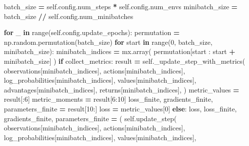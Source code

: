 \documentclass[
  american,
  11pt,
  letterpaper,
]{article}
\newenvironment{Shaded}{\begin{snugshade}}{\end{snugshade}}
\newcommand{\BuiltInTok}[1]{#1}
\newcommand{\ControlFlowTok}[1]{\textcolor[rgb]{0.13,0.29,0.53}{\textbf{#1}}}
\newcommand{\DecValTok}[1]{\textcolor[rgb]{0.00,0.00,0.81}{#1}}
\newcommand{\KeywordTok}[1]{\textcolor[rgb]{0.13,0.29,0.53}{\textbf{#1}}}
\newcommand{\NormalTok}[1]{#1}
\newcommand{\OperatorTok}[1]{\textcolor[rgb]{0.81,0.36,0.00}{\textbf{#1}}}
\newcommand{\VariableTok}[1]{\textcolor[rgb]{0.00,0.00,0.00}{#1}}
\renewenvironment{Shaded}{\par\smallskip}{\par\smallskip}
\begin{document}
\begin{Shaded}
\begin{Highlighting}[]
\NormalTok{        batch\_size }\OperatorTok{=} \VariableTok{self}\NormalTok{.config.num\_steps }\OperatorTok{*} \VariableTok{self}\NormalTok{.config.num\_envs}
\NormalTok{        minibatch\_size }\OperatorTok{=}\NormalTok{ batch\_size }\OperatorTok{//} \VariableTok{self}\NormalTok{.config.num\_minibatches}

        \ControlFlowTok{for}\NormalTok{ \_ }\KeywordTok{in} \BuiltInTok{range}\NormalTok{(}\VariableTok{self}\NormalTok{.config.update\_epochs):}
\NormalTok{            permutation }\OperatorTok{=}\NormalTok{ np.random.permutation(batch\_size)}
            \ControlFlowTok{for}\NormalTok{ start }\KeywordTok{in} \BuiltInTok{range}\NormalTok{(}\DecValTok{0}\NormalTok{, batch\_size, minibatch\_size):}
\NormalTok{                minibatch\_indices }\OperatorTok{=}\NormalTok{ mx.array(}
\NormalTok{                    permutation[start : start }\OperatorTok{+}\NormalTok{ minibatch\_size]}
\NormalTok{                )}
                \ControlFlowTok{if}\NormalTok{ collect\_metrics:}
\NormalTok{                    result }\OperatorTok{=} \VariableTok{self}\NormalTok{.\_update\_step\_with\_metrics(}
\NormalTok{                        observations[minibatch\_indices],}
\NormalTok{                        actions[minibatch\_indices],}
\NormalTok{                        log\_probabilities[minibatch\_indices],}
\NormalTok{                        values[minibatch\_indices],}
\NormalTok{                        advantages[minibatch\_indices],}
\NormalTok{                        returns[minibatch\_indices],}
\NormalTok{                    )}
\NormalTok{                    metric\_values }\OperatorTok{=}\NormalTok{ result[:}\DecValTok{6}\NormalTok{]}
\NormalTok{                    metric\_moments }\OperatorTok{=}\NormalTok{ result[}\DecValTok{6}\NormalTok{:}\DecValTok{10}\NormalTok{]}
\NormalTok{                    loss\_finite, gradients\_finite, parameters\_finite }\OperatorTok{=}\NormalTok{ result[}\DecValTok{10}\NormalTok{:]}
\NormalTok{                    loss }\OperatorTok{=}\NormalTok{ metric\_values[}\DecValTok{0}\NormalTok{]}
                \ControlFlowTok{else}\NormalTok{:}
\NormalTok{                    loss, loss\_finite, gradients\_finite, parameters\_finite }\OperatorTok{=}\NormalTok{ (}
                        \VariableTok{self}\NormalTok{.update\_step(}
\NormalTok{                            observations[minibatch\_indices],}
\NormalTok{                            actions[minibatch\_indices],}
\NormalTok{                            log\_probabilities[minibatch\_indices],}
\NormalTok{                            values[minibatch\_indices],}

\end{Highlighting}
\end{Shaded}
\end{document}
